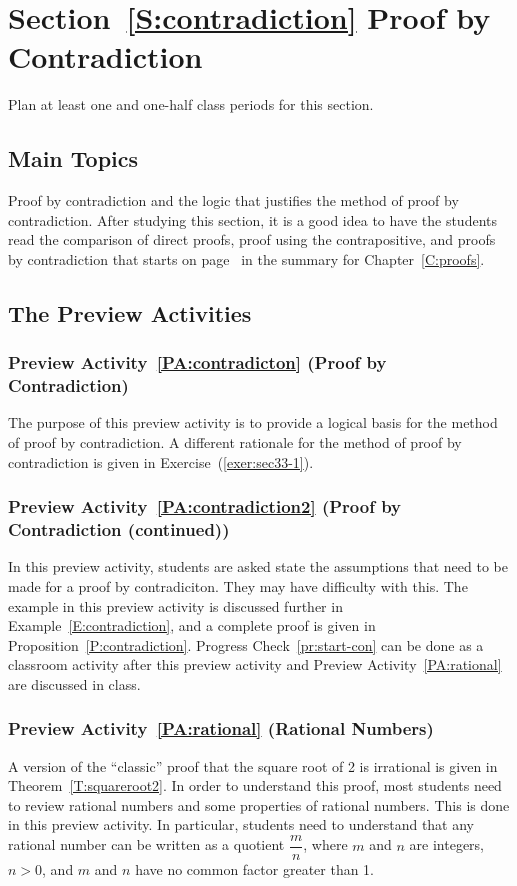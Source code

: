 \section*{Section~\ref{S:contradiction} Proof by Contradiction}
Plan at least one and one-half class periods for this section.  


\subsection*{Main Topics}
Proof by contradiction and the logic that justifies the method of proof by contradiction.  After studying this section, it is a good idea to have the students read the comparison of direct proofs, proof using the contrapositive, and proofs by contradiction that starts on page~\pageref{SS:proofcompare} in the summary for Chapter~\ref{C:proofs}.

\subsection*{The Preview Activities}
\subsubsection*{Preview Activity~\ref{PA:contradicton} (Proof by Contradiction)} 
The purpose of this preview activity is to provide a logical basis for the method of proof by contradiction.  A different rationale for the method of proof by contradiction is given in 
Exercise~(\ref{exer:sec33-1}).

\subsubsection*{Preview Activity~\ref{PA:contradiction2} (Proof by Contradiction (continued))}  
In this preview activity, students are asked state the assumptions that need to be made for a  proof by contradiciton.  They may have difficulty with this.  The example in this preview activity is discussed further in Example~\ref{E:contradiction}, and a complete proof is given in Proposition~\ref{P:contradiction}.   Progress Check~\ref{pr:start-con} can be done as a classroom activity after this preview activity and Preview Activity~\ref{PA:rational} are discussed in class.  

\subsubsection*{Preview Activity~\ref{PA:rational} (Rational Numbers)}
A version of the ``classic'' proof that the square root of 2 is irrational is given in 
Theorem~\ref{T:squareroot2}.  In order to understand this proof, most students need to review rational numbers and some properties of rational numbers.  This is done in this preview activity.  In particular, students need to understand that any rational number can be written as a quotient $\dfrac{m}{n}$, where $m$ and $n$ are integers, $ n > 0 $, and $m$ and $n$ have no common factor greater than 1.
\hbreak

